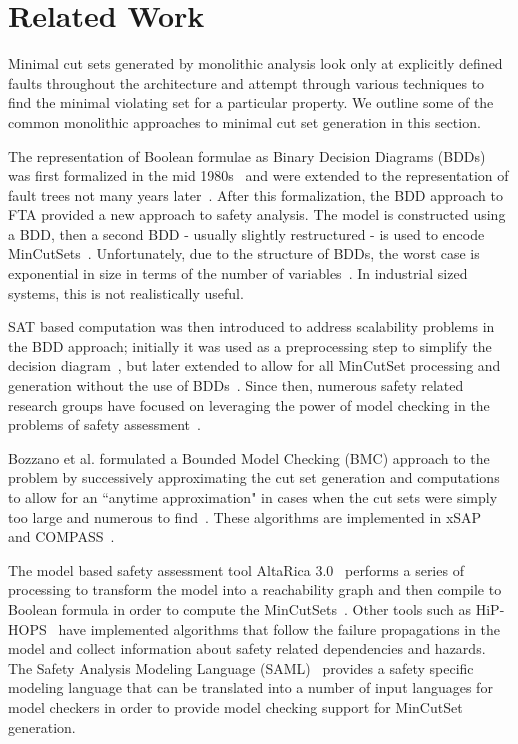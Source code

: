 \section{Related Work}
\label{sec:related_work}
Minimal cut sets generated by monolithic analysis look only at explicitly defined faults throughout the architecture and attempt through various techniques to find the minimal violating set for a particular property. We outline some of the common monolithic approaches to minimal cut set generation in this section.

The representation of Boolean formulae as Binary Decision Diagrams (BDDs) was first formalized in the mid 1980s~\cite{bryant1986graph} and were extended to the representation of fault trees not many years later~\cite{rauzy1993new}. After this formalization, the BDD approach to FTA provided a new approach to safety analysis. The model is constructed using a BDD, then a second BDD - usually slightly restructured - is used to encode MinCutSets~\cite{rauzy2008binary}. Unfortunately, due to the structure of BDDs, the worst case is exponential in size in terms of the number of variables~\cite{bryant1986graph,rauzy1993new,rauzy2008binary}. In industrial sized systems, this is not realistically useful. 

SAT based computation was then introduced to address scalability problems in the BDD approach; initially it was used as a preprocessing step to simplify the decision diagram~\cite{bozzano2015safety}, but later extended to allow for all MinCutSet processing and generation without the use of BDDs~\cite{bozzano2015efficient}. Since then, numerous safety related research groups have focused on leveraging the power of model checking in the problems of safety assessment~\cite{bieber2002combination,schafer2003combining,bozzano2007symbolic,bozzano2003improving,volk2017fast,Joshi05:SafeComp,bozzano2015efficient,stewart2020safety}. 

Bozzano et al. formulated a Bounded Model Checking (BMC) approach to the problem by successively approximating the cut set generation and computations to allow for an ``anytime approximation" in cases when the cut sets were simply too large and numerous to find~\cite{bozzano2015efficient,mattarei2016scalable}. These algorithms are implemented in xSAP~\cite{DBLP:conf/tacas/BittnerBCCGGMMZ16} and COMPASS~\cite{compass30toolset}. 

The model based safety assessment tool AltaRica 3.0~\cite{prosvirnova:tel-01119730} performs a series of processing to transform the model into a reachability graph and then compile to Boolean formula in order to compute the MinCutSets~\cite{prosvirnova2015automated}. Other tools such as HiP-HOPS~\cite{papadopoulos2001model} have implemented algorithms that follow the failure propagations in the model and collect information about safety related dependencies and hazards. The Safety Analysis Modeling Language (SAML)~\cite{Gudemann:2010:FQQ:1909626.1909813} provides a safety specific modeling language that can be translated into a number of input languages for model checkers in order to provide model checking support for MinCutSet generation.

